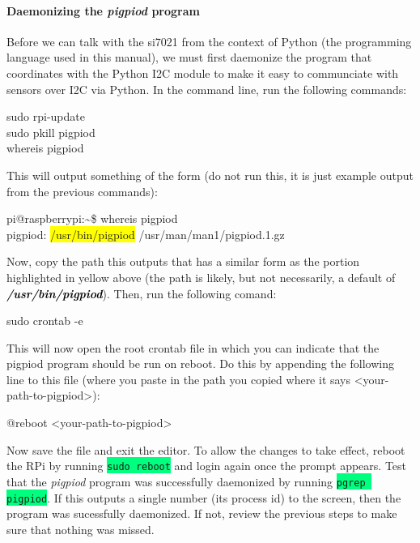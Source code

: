 \documentclass{article}
\newcommand*{\myfont}{\fontfamily{pcr}\selectfont}
\newcommand{\codei}[1]{\colorbox{SpringGreen}{\texttt{#1}}} %
\newcommand{\codeb}[2]{
  \begin{tcolorbox}[width=\textwidth,colback={SpringGreen},title={#1},colbacktitle=darkgreen,coltitle=SpringGreen]
    \myfont
    #2
  \end{tcolorbox}
} %
\newcommand{\outputb}[2]{
  \begin{tcolorbox}[width=\textwidth,colback={light-gray},title={#1},colbacktitle=gray,coltitle=light-gray]
    \myfont
    #2
  \end{tcolorbox}
} %
\newcommand{\loc}[1]{\textit{\textcolor{Black}{\textbf{#1}}}} %
\begin{document}
  \paragraph{Daemonizing the \textit{pigpiod} program}
    Before we can talk with the si7021 from the context of Python (the programming language used in this manual), we must first daemonize the program that coordinates with the Python I2C module to make it easy to communciate with sensors over I2C via Python. In the command line, run the following commands:
    \codeb{Prep the environment and locate \textit{pigpiod}}
    {
      sudo rpi-update     \\
      sudo pkill pigpiod  \\
      whereis pigpiod
    }
    This will output something of the form (do not run this, it is just example output from the previous commands):
    \outputb{\texttt{whereis pigpiod} command output}
    {
      pi@raspberrypi:\textasciitilde \$ whereis pigpiod \\
      pigpiod: \colorbox{Yellow}{/usr/bin/pigpiod} /usr/man/man1/pigpiod.1.gz
    }
    Now, copy the path this outputs that has a similar form as the portion highlighted in yellow above (the path is likely, but not necessarily, a default of \loc{/usr/bin/pigpiod}). Then, run the following comand:
    \codeb{Open the root crontab}
    {
      sudo crontab -e
    }
    This will now open the root crontab file in which you can indicate that the pigpiod program should be run on reboot. Do this by appending the following line to this file (where you paste in the path you copied where it says <your-path-to-pigpiod>):
    \outputb{Daemonize \textit{pigpiod} command}
    {
      @reboot              <your-path-to-pigpiod>
    }
    Now save the file and exit the editor. To allow the changes to take effect, reboot the RPi by running \codei{sudo reboot} and login again once the prompt appears. Test that the \textit{pigpiod} program was successfully daemonized by running \codei{pgrep pigpiod}. If this outputs a single number (its process id) to the screen, then the program was sucessfully daemonized. If not, review the previous steps to make sure that nothing was missed.
\end{document}
